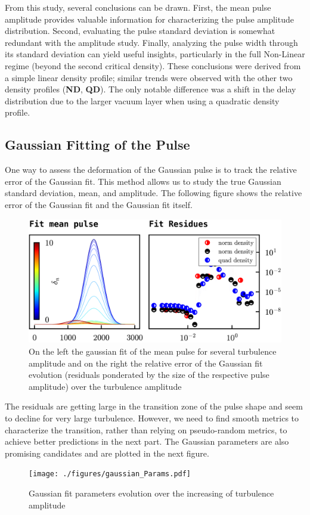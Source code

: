 \documentclass[11pt,a4paper,openany]{report}
\begin{document}
\begin{multicols}{2}
    From this study, several conclusions can be drawn. First, the mean pulse amplitude provides valuable information for characterizing the pulse amplitude distribution. Second, evaluating the pulse standard deviation is somewhat redundant with the amplitude study. Finally, analyzing the pulse width through its standard deviation can yield useful insights, particularly in the full Non-Linear regime (beyond the second critical density). These conclusions were derived from a simple linear density profile; similar trends were observed with the other two density profiles (\textbf{ND}, \textbf{QD}). The only notable difference was a shift in the delay distribution due to the larger vacuum layer when using a quadratic density profile.

    \subsection{Gaussian Fitting of the Pulse}

    One way to assess the deformation of the Gaussian pulse is to track the relative error of the Gaussian fit. This method allows us to study the true Gaussian standard deviation, mean, and amplitude. The following figure shows the relative error of the Gaussian fit and the Gaussian fit itself.
    \begin{figure}[H]
        \centering
        \includegraphics[width=1\linewidth]{./figures/gaussian_fit.png}
        \caption{On the left the gaussian fit of the mean pulse for several turbulence amplitude and on the right the relative error of the Gaussian fit evolution (residuals ponderated by the size of the respective pulse amplitude) over the turbulence amplitude}
        \label{}
    \end{figure}
    The residuals are getting large in the transition zone of the pulse shape and seem to decline for very large turbulence. However, we need to find smooth metrics to characterize the transition, rather than relying on pseudo-random metrics, to achieve better predictions in the next part. The Gaussian parameters are also promising candidates and are plotted in the next figure.
    \begin{figure}[H]
        \centering
        \texttt{[image: ./figures/gaussian\_Params.pdf]}
        \caption{Gaussian fit parameters evolution over the increasing of turbulence amplitude}
        \label{}
    \end{figure}


\end{multicols}
\end{document}
